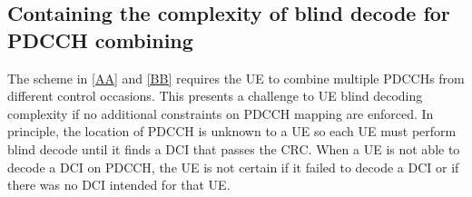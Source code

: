 \documentclass[conference,10pt]{IEEEtran}
\begin{document}

\subsection{Containing the complexity of blind decode for PDCCH combining}\label{DD}

The scheme in \ref{AA} and \ref{BB} requires the UE to combine multiple PDCCHs from different control occasions. This presents a challenge to UE blind decoding complexity if no additional constraints on PDCCH mapping are enforced. In principle, the location of PDCCH is unknown to a UE so each UE must perform blind decode until it finds a DCI that passes the CRC. When a UE is not able to decode a DCI on PDCCH, the UE is not certain if it failed to decode a DCI or if there was no DCI intended for that UE. 
\end{document}
